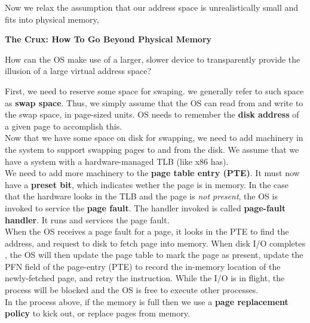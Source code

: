 Now we relax the assumption that our address space is unrealistically small
and fits into physical memory,

\begin{tcolorbox}
    \begin{center}
        \textbf{The Crux: How To Go Beyond Physical Memory}
    \end{center}

    How can the OS make use of a larger, slower device to transparently provide
    the illusion of a large virtual address space?
\end{tcolorbox}

First, we need to reserve some space for swaping. we generally refer to such
space as \textbf{swap space}. Thus, we simply assume that the OS can read from
and write to the swap space, in page-sized units. OS needs to remember the
\textbf{disk address} of a given page to accomplish this.\\

Now that we have some space on disk for swapping, we need to add machinery in
the system to support swapping pages to and from the disk. We assume that we
have a system with a hardware-managed TLB (like x86 has).\\

We need to add more machinery to the \textbf{page table entry (PTE)}. It must
now have a \textbf{preset bit}, which indicates wether the page is in memory.
In the case that the hardware looks in the TLB and the page is \textit{not
present}, the OS is invoked to service the \textbf{page fault}. The handler
invoked is called \textbf{page-fault handler}. It runs and services the page
fault.\\

When the OS receives a page fault for a page, it looks in the PTE to find the
address, and request to disk to fetch page into memory. When disk I/O completes
, the OS will then update the page table to mark the page as present, update
the PFN field of the page-entry (PTE) to record the in-memory location of
the newly-fetched page, and retry the instruction. While the I/O is in flight, 
the process will be blocked and the OS is free to execute other processes.\\

In the process above, if the memory is full then we use a \textbf{page
replacement policy} to kick out, or replace pages from memory.
